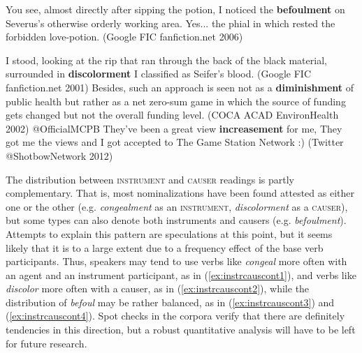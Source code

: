 \begin{exe}
  \ex \label{ex:coscauser}
  \begin{xlist}
    \item \label{ex:coscauser1} You see, almost directly after sipping the potion, I noticed the \textbf{befoulment} on Severus's otherwise orderly working area. Yes... the phial in which rested the forbidden love-potion. {\small(Google FIC fanfiction.net 2006)}
    \item \label{ex:coscauser2} I stood, looking at the rip that ran through the back of the black material, surrounded in \textbf{discolorment} I classified as Seifer's blood. {\small(Google FIC fanfiction.net 2001)}
    \ex \label{ex:coscauser3} Besides, such an approach is seen not as a \textbf{diminishment} of public health but rather as a net zero-sum game in which the source of funding gets changed but not the overall funding level. {\small(\acs{COCA} ACAD EnvironHealth 2002)}
    \ex \label{ex:cos.instrcauser} @OfficialMCPB They've been a great view \textbf{increasement} for me, They got me the views and I got accepted to The Game Station Network :)
    {\small(Twitter @ShotbowNetwork 2012)}
  \end{xlist}
\end{exe}

\noindent The distribution between \textsc{instrument} and \textsc{causer} readings is partly complementary. That is, most nominalizations have been found attested as either one or the other (e.g. \textit{congealment} as an \textsc{instrument}, \textit{discolorment} as a \textsc{causer}), but some types can also denote both instruments and causers (e.g. \textit{befoulment}). 
Attempts to explain this pattern are speculations at this point, but it seems likely that it is to a large extent due to a frequency effect of the base verb participants. Thus, speakers may tend to use verbs like \textit{congeal} more often with an agent and an instrument participant, as in (\ref{ex:instrcauscont1}), and verbs like \textit{discolor} more often with a causer, as in (\ref{ex:instrcauscont2}), while the distribution of \textit{befoul} may be rather balanced, as in (\ref{ex:instrcauscont3}) and (\ref{ex:instrcauscont4}). 
Spot checks in the corpora verify that there are definitely tendencies in this direction, but a robust quantitative analysis will have to be left for future research. 


